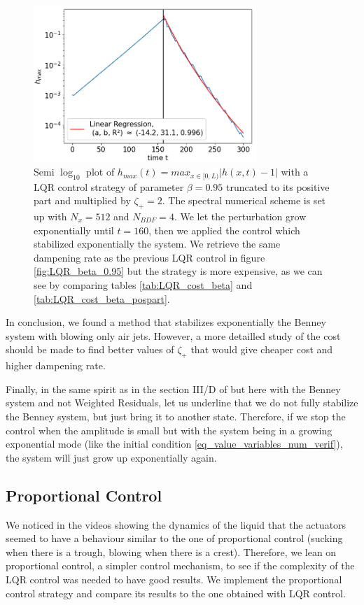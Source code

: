 \documentclass[12pt]{article}
\begin{document}
\begin{figure}[h]
\centering
\includegraphics[width=0.75\textwidth]{Control_experiments/Pos_part2_LQR_beta_0.95.png}
\caption{Semi $\log_{10}$ plot of $h_{max}(t)=max_{x\in [0, L)}|h(x,t)-1|$ with a LQR control strategy of parameter $\beta=0.95$ truncated to its positive part and multiplied by $\zeta_+ = 2$. The spectral numerical scheme is set up with $N_x = 512$ and $N_{BDF}=4$. We let the perturbation grow exponentially until $t=160$, then we applied the  control which stabilized exponentially the system. We retrieve the same dampening rate as the previous LQR control in figure \ref{fig:LQR_beta_0.95} but the strategy is more expensive, as we can see by comparing tables \ref{tab:LQR_cost_beta} and \ref{tab:LQR_cost_beta_pospart}. }
\label{fig:Pos_part2_LQR_beta_0.95}
\end{figure}

In conclusion, we found a method that stabilizes exponentially the Benney system with blowing only air jets.
However, a more detailled study of the cost should be made to find better values of $\zeta_+$
that would give cheaper cost and higher dampening rate. 

Finally, in the same spirit as in the section III/D of \cite{Thompson_2016_prop_ctrl} but here with the Benney system and not Weighted Residuals,
let us underline that we do not fully stabilize the Benney system, but just bring it to another state. Therefore, if we stop the control when the amplitude 
is small but with the system being in a growing exponential mode (like the initial condition \eqref{eq_value_variables_num_verif}),
the system will just grow up exponentially again. 


\subsection{Proportional Control}
We noticed in the videos showing the dynamics of the liquid that the actuators seemed to have a behaviour similar to the one of proportional 
control (sucking when there is a trough, blowing when there is a crest). Therefore, we lean on proportional control,
a simpler control mechanism, to see if the complexity of the LQR control was needed to have good results.
We implement the proportional control strategy and compare its results to the one obtained with LQR control.
\end{document}
